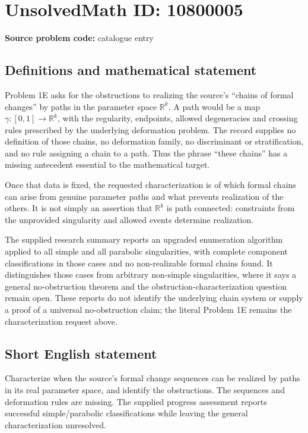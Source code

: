 \documentclass[11pt]{article}
\newcommand{\R}{\mathbb{R}}
\begin{document}
\section*{UnsolvedMath ID: 10800005}
\textbf{Source problem code:} catalogue entry
\subsection{Definitions and mathematical statement}
Problem 1E asks for the obstructions to realizing the source's ``chains of formal changes'' by paths in the parameter space \(\R^k\). A path would be a map \(\gamma:[0,1]\to\R^k\), with the regularity, endpoints, allowed degeneracies and crossing rules prescribed by the underlying deformation problem. The record supplies no definition of those chains, no deformation family, no discriminant or stratification, and no rule assigning a chain to a path. Thus the phrase ``these chains'' has a missing antecedent essential to the mathematical target.

Once that data is fixed, the requested characterization is of which formal chains can arise from genuine parameter paths and what prevents realization of the others. It is not simply an assertion that \(\R^k\) is path connected: constraints from the unprovided singularity and allowed events determine realization.

The supplied research summary reports an upgraded enumeration algorithm applied to all simple and all parabolic singularities, with complete component classifications in those cases and no non-realizable formal chains found. It distinguishes those cases from arbitrary non-simple singularities, where it says a general no-obstruction theorem and the obstruction-characterization question remain open. These reports do not identify the underlying chain system or supply a proof of a universal no-obstruction claim; the literal Problem 1E remains the characterization request above.
\subsection{Short English statement}
Characterize when the source's formal change sequences can be realized by paths in its real parameter space, and identify the obstructions. The sequences and deformation rules are missing. The supplied progress assessment reports successful simple/parabolic classifications while leaving the general characterization unresolved.
\end{document}
